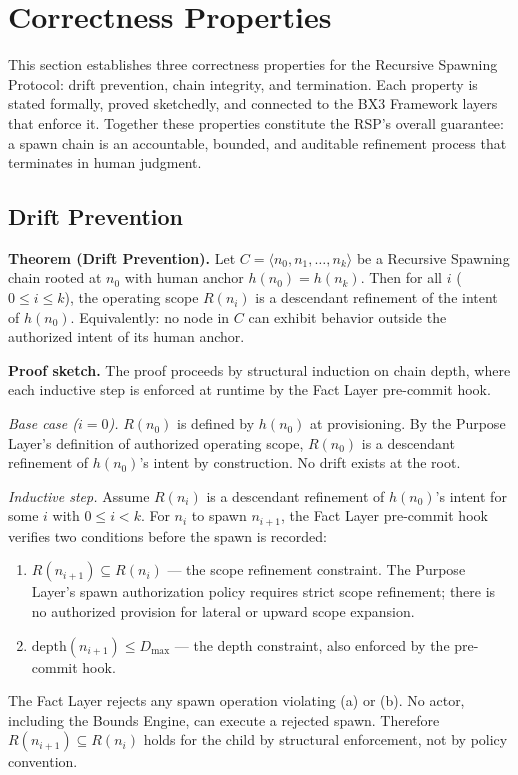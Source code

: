 \section{Correctness Properties}
\label{sec:rs-correctness}

This section establishes three correctness properties for the Recursive Spawning Protocol: drift prevention, chain integrity, and termination. Each property is stated formally, proved sketchedly, and connected to the BX3 Framework layers that enforce it. Together these properties constitute the RSP's overall guarantee: a spawn chain is an accountable, bounded, and auditable refinement process that terminates in human judgment.

\subsection{Drift Prevention}
\label{sec:rs-drift-prevention}

\medskip
\noindent\textbf{Theorem (Drift Prevention).}
Let $C = \langle n_0, n_1, \ldots, n_k \rangle$ be a Recursive Spawning chain rooted at $n_0$ with human anchor $h(n_0) = h(n_k)$. Then for all $i$ ($0 \leq i \leq k$), the operating scope $R(n_i)$ is a descendant refinement of the intent of $h(n_0)$. Equivalently: no node in $C$ can exhibit behavior outside the authorized intent of its human anchor.

\medskip
\noindent\textbf{Proof sketch.}
The proof proceeds by structural induction on chain depth, where each inductive step is enforced at runtime by the Fact Layer pre-commit hook.

\medskip
\textit{Base case ($i=0$).}
$R(n_0)$ is defined by $h(n_0)$ at provisioning. By the Purpose Layer's definition of authorized operating scope, $R(n_0)$ is a descendant refinement of $h(n_0)$'s intent by construction. No drift exists at the root.

\medskip
\textit{Inductive step.}
Assume $R(n_i)$ is a descendant refinement of $h(n_0)$'s intent for some $i$ with $0 \leq i < k$. For $n_i$ to spawn $n_{i+1}$, the Fact Layer pre-commit hook verifies two conditions before the spawn is recorded:
\begin{enumerate}
    \item[(a)] $R(n_{i+1}) \subseteq R(n_i)$ — the scope refinement constraint. The Purpose Layer's spawn authorization policy requires strict scope refinement; there is no authorized provision for lateral or upward scope expansion.
    \item[(b)] $\mathrm{depth}(n_{i+1}) \leq D_{\mathrm{max}}$ — the depth constraint, also enforced by the pre-commit hook.
\end{enumerate}
The Fact Layer rejects any spawn operation violating (a) or (b). No actor, including the Bounds Engine, can execute a rejected spawn. Therefore $R(n_{i+1}) \subseteq R(n_i)$ holds for the child by structural enforcement, not by policy convention.

